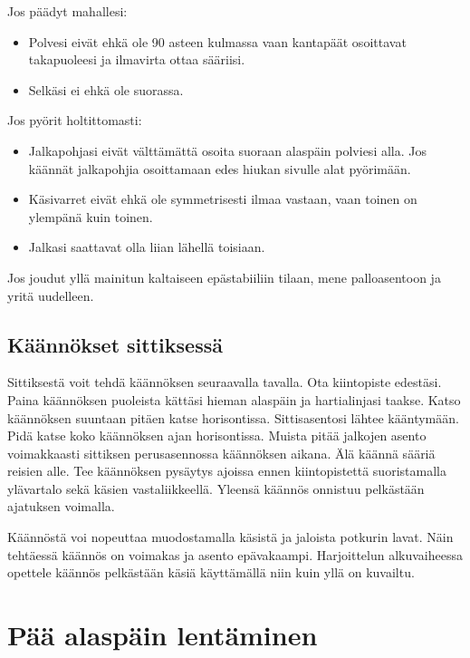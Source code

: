 Jos päädyt mahallesi: 

\begin{itemize}
\item  Polvesi eivät ehkä ole 90 asteen kulmassa vaan kantapäät osoittavat takapuoleesi ja ilmavirta ottaa sääriisi. 
\item  Selkäsi ei ehkä ole suorassa. 
\end{itemize}

Jos pyörit holtittomasti: 

\begin{itemize}
\item  Jalkapohjasi eivät välttämättä osoita suoraan alaspäin polviesi alla. Jos käännät jalkapohjia osoittamaan edes hiukan sivulle alat pyörimään. 
\item  Käsivarret eivät ehkä ole symmetrisesti ilmaa vastaan, vaan toinen on ylempänä kuin toinen. 
\item  Jalkasi saattavat olla liian lähellä toisiaan. 
\end{itemize}

Jos joudut yllä mainitun kaltaiseen epästabiiliin tilaan, mene palloasentoon ja yritä uudelleen. 

\subsection{ Käännökset sittiksessä }
\label{freefly-lentoasennot-kaannokset-sittiksessa}


Sittiksestä voit tehdä käännöksen seuraavalla tavalla. Ota kiintopiste edestäsi. Paina käännöksen puoleista kättäsi hieman alaspäin ja hartialinjasi taakse. Katso käännöksen suuntaan pitäen katse horisontissa. Sittisasentosi lähtee kääntymään. Pidä katse koko käännöksen ajan horisontissa. Muista pitää jalkojen asento voimakkaasti sittiksen perusasennossa käännöksen aikana. Älä käännä sääriä reisien alle. Tee käännöksen pysäytys ajoissa ennen kiintopistettä suoristamalla ylävartalo sekä käsien vastaliikkeellä. Yleensä käännös onnistuu pelkästään ajatuksen voimalla. 


Käännöstä voi nopeuttaa muodostamalla käsistä ja jaloista potkurin lavat. Näin tehtäessä käännös on voimakas ja asento epävakaampi. Harjoittelun alkuvaiheessa opettele käännös pelkästään käsiä käyttämällä niin kuin yllä on kuvailtu. 

\section{ Pää alaspäin lentäminen  }
\label{freefly-lentoasennot-paa-alaspain-lentaminen}


